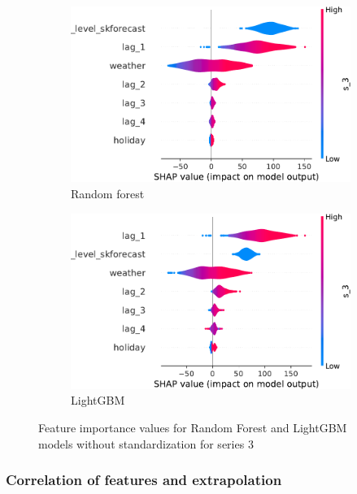 \begin{figure}
    \centering
    \begin{subfigure}[b]{0.45\textwidth}
        \includegraphics[width=\textwidth]{chapters/04_feature_importance_estimation/img/standardization/lin/rf_forecaster_nonscaled/shap_violin_s_3}
        \caption{Random forest}
    \end{subfigure}
    \hfill
    \begin{subfigure}[b]{0.45\textwidth}
        \includegraphics[width=\textwidth]{chapters/04_feature_importance_estimation/img/standardization/lin/lgbm_nonscaled/shap_violin_s_3}
        \caption{LightGBM}
    \end{subfigure}
    \caption{Feature importance values for Random Forest and LightGBM models without standardization for series 3}\label{fig:fig:sc_nsc_rf_lgbm_s3}
\end{figure}

\subsubsection{Correlation of features and extrapolation} \label{subsec:correlation_of_features_and_importance}


